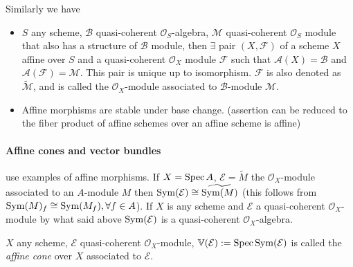 \documentclass[main]{subfiles}
\begin{document}
Similarly we have

\begin{itemize}
\item $S$ any scheme, $\mathcal B$ quasi-coherent $\mathcal O_S$-algebra, $\mathcal M$ quasi-coherent $\mathcal O_S$ module that also has a structure of $\mathcal B$ module, then $\exists$ pair $(X,\mathcal F)$ of a scheme $X$ affine over $S$ and a quasi-coherent $\mathcal O_X$ module $\mathcal F$ such that $\mathcal A(X)=\mathcal B$ and $\mathcal A(\mathcal F)=\mathcal M$. This pair is unique up to isomorphism. $\mathcal F$ is also denoted as $\widetilde{\mathcal M}$, and is called the $\mathcal O_X$-module associated to $\mathcal B$-module $\mathcal M$.
\item Affine morphisms are stable under base change. (assertion can be reduced to the fiber product of affine schemes over an affine scheme is affine)
\end{itemize}

\paragraph{Affine cones and vector bundles} use examples of affine morphisms. If $X=\operatorname{Spec} A$, $\mathcal E=\widetilde M$ the $\mathcal O_X$-module associated to an $A$-module $M$ then $\operatorname{Sym}(\mathcal E)\cong\widetilde{\operatorname{Sym}(M)}$ (this follows from $\operatorname{Sym}(M)_f\cong\operatorname{Sym}(M_f),\forall f\in A$). If $X$ is any scheme and $\mathcal E$ a quasi-coherent $\mathcal O_X$-module by what said above $\operatorname{Sym}(\mathcal E)$ is a quasi-coherent $\mathcal O_X$-algebra.

\begin{definition}
$X$ any scheme, $\mathcal E$ quasi-coherent $\mathcal O_X$-module, $\mathbb V(\mathcal E):=\operatorname{Spec}\operatorname{Sym}(\mathcal E)$ is called the \textit{affine cone} over $X$ associated to $\mathcal E$.
\end{definition}
\end{document}
